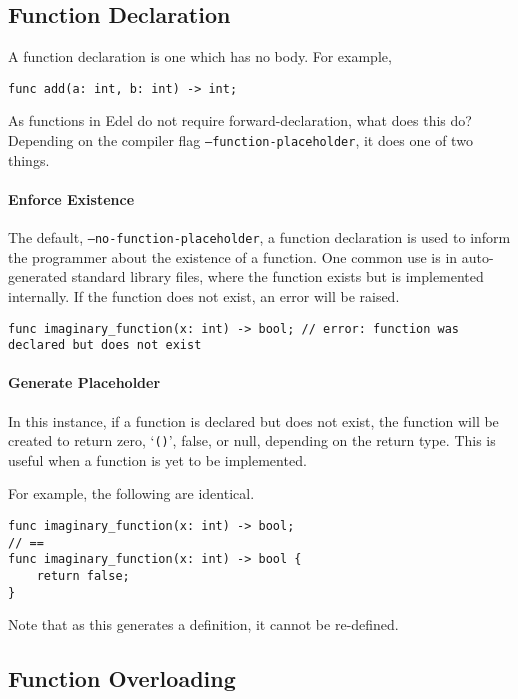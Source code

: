 \subsection{Function Declaration}\label{subsec:function-declaration}

A function declaration is one which has no body.
For example,

\begin{lstlisting}[language=CustomLang]
func add(a: int, b: int) -> int;
\end{lstlisting}

As functions in Edel do not require forward-declaration, what does this do?
Depending on the compiler flag \texttt{--function-placeholder}, it does one of two things.

\paragraph*{Enforce Existence}

The default, \texttt{--no-function-placeholder}, a function declaration is used to inform the programmer about the existence of a function.
One common use is in auto-generated standard library files, where the function exists but is implemented internally.
If the function does not exist, an error will be raised.

\begin{lstlisting}[language=CustomLang]
func imaginary_function(x: int) -> bool; // error: function was declared but does not exist
\end{lstlisting}

\paragraph*{Generate Placeholder}

In this instance, if a function is declared but does not exist, the function will be created to return zero, `\texttt{()}', false, or null, depending on the return type.
This is useful when a function is yet to be implemented.

For example, the following are identical.
\begin{lstlisting}[language=CustomLang]
func imaginary_function(x: int) -> bool;
// ==
func imaginary_function(x: int) -> bool {
    return false;
}
\end{lstlisting}


Note that as this generates a definition, it cannot be re-defined.

\subsection{Function Overloading}\label{subsec:function-overloading}

